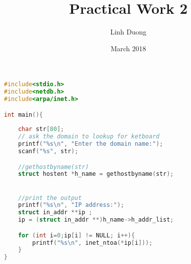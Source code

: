 \documentclass{article}
\title{Practical Work 2}
\author{Linh Duong}
\date{March 2018}
\begin{document}
\maketitle

\begin{lstlisting}[language = c]
#include<stdio.h>
#include<netdb.h>
#include<arpa/inet.h>

int main(){
	
	char str[80];
	// ask the domain to lookup for ketboard
	printf("%s\n", "Enter the domain name:");
	scanf("%s", str);

	//gethostbyname(str)
	struct hostent *h_name = gethostbyname(str);


	//print the output
	printf("%s\n", "IP address:");
	struct in_addr **ip ;
	ip = (struct in_addr **)h_name->h_addr_list;

	for (int i=0;ip[i] != NULL; i++){
		printf("%s\n", inet_ntoa(*ip[i]));
	}
}
\end{lstlisting}
\end{document}

